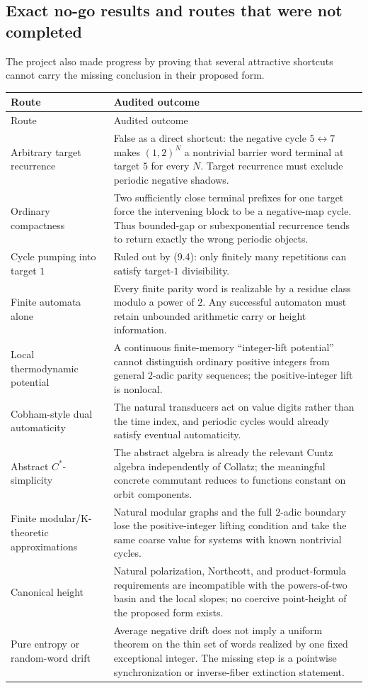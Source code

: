 \documentclass[11pt]{article}
\theoremstyle{definition}
\theoremstyle{remark}
\begin{document}
\subsection{Exact no-go results and routes that were not completed}

The project also made progress by proving that several attractive shortcuts
cannot carry the missing conclusion in their proposed form.

\begin{longtable}{@{}p{}p{}@{}}
\toprule
Route & Audited outcome\\
\midrule
\endfirsthead
\toprule
Route & Audited outcome\\
\midrule
\endhead
Arbitrary target recurrence & False as a direct shortcut: the negative cycle $5\leftrightarrow7$ makes $(1,2)^N$ a nontrivial barrier word terminal at target $5$ for every $N$.  Target recurrence must exclude periodic negative shadows.\\
Ordinary compactness & Two sufficiently close terminal prefixes for one target force the intervening block to be a negative-map cycle.  Thus bounded-gap or subexponential recurrence tends to return exactly the wrong periodic objects.\\
Cycle pumping into target $1$ & Ruled out by \textup{(9.4)}: only finitely many repetitions can satisfy target-$1$ divisibility.\\
Finite automata alone & Every finite parity word is realizable by a residue class modulo a power of $2$.  Any successful automaton must retain unbounded arithmetic carry or height information.\\
Local thermodynamic potential & A continuous finite-memory ``integer-lift potential'' cannot distinguish ordinary positive integers from general $2$-adic parity sequences; the positive-integer lift is nonlocal.\\
Cobham-style dual automaticity & The natural transducers act on value digits rather than the time index, and periodic cycles would already satisfy eventual automaticity.\\
Abstract $C^*$-simplicity & The abstract algebra is already the relevant Cuntz algebra independently of Collatz; the meaningful concrete commutant reduces to functions constant on orbit components.\\
Finite modular/K-theoretic approximations & Natural modular graphs and the full $2$-adic boundary lose the positive-integer lifting condition and take the same coarse value for systems with known nontrivial cycles.\\
Canonical height & Natural polarization, Northcott, and product-formula requirements are incompatible with the powers-of-two basin and the local slopes; no coercive point-height of the proposed form exists.\\
Pure entropy or random-word drift & Average negative drift does not imply a uniform theorem on the thin set of words realized by one fixed exceptional integer.  The missing step is a pointwise synchronization or inverse-fiber extinction statement.\\
\bottomrule
\end{longtable}
\end{document}
